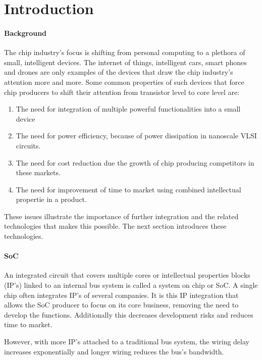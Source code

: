 \section{Introduction}

\paragraph{Background} \cite{SoC-market}

The chip industry's focus is shifting from personal computing to 
a plethora of small, intelligent devices. The internet of things, intelligent cars,
smart phones and drones are only examples of the devices that draw the chip industry's 
attention more and more. 
Some common properties of such devices that force chip producers to shift their attention 
from transistor level to core level are:

\begin{enumerate}
\item The need for integration of multiple powerful functionalities into a small device
\item The need for power efficiency, because of power dissipation in nanoscale VLSI circuits. 
\item The need for cost reduction due the growth of chip producing competitors in these markets.
\item The need for improvement of time to market using combined intellectual propertie in a product.
\end{enumerate}

These issues illustrate the importance of further integration and the
related technologies that makes this possible. The next section introduces these technologies.

\paragraph{SoC}

An integrated circuit that covers multiple cores or intellectual properties
blocks (IP's) linked to an internal bus system is called a system on
chip or SoC. A single chip often integrates IP's of several companies. It is this
IP integration that allows the SoC producer to focus on its core business, removing the 
need to develop the functions. Additionally this decreases development risks and reduces time to market.

However, with more IP's attached to a traditional bus system, the wiring delay increases 
exponentially and longer wiring reduces the bus's bandwidth.\cite{SoC}

